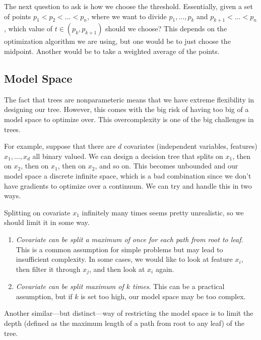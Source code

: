   The next question to ask is how we choose the threshold. Essentially, given a set of points $p_1 < p_2 < \ldots < p_n$, where we want to divide $p_1, \ldots, p_k$ and $p_{k+1} < \ldots < p_n$, which value of $t \in (p_k, p_{k+1})$ should we choose? This depends on the optimization algorithm we are using, but one would be to just choose the midpoint. Another would be to take a weighted average of the points. 

\subsection{Model Space} 

  The fact that trees are nonparameteric means that we have extreme flexibility in designing our tree. However, this comes with the big risk of having too big of a model space to optimize over. This overcomplexity is one of the big challenges in trees. 

  For example, suppose that there are $d$ covariates (independent variables, features) $x_1, \ldots, x_d$ all binary valued. We can design a decision tree that splits on $x_1$, then on $x_2$, then on $x_1$, then on $x_2$, and so on. This becomes unbounded and our model space a discrete infinite space, which is a bad combination since we don't have gradients to optimize over a continuum. We can try and handle this in two ways. 

  \begin{example}
    Splitting on covariate $x_1$ infinitely many times seems pretty unrealistic, so we should limit it in some way. 
    \begin{enumerate}
      \item \textit{Covariate can be split a maximum of once for each path from root to leaf}. This is a common assumption for simple problems but may lead to insufficient complexity. In some cases, we would like to look at feature $x_i$, then filter it through $x_j$, and then look at $x_i$ again.
      \item \textit{Covariate can be split maximum of $k$ times}. This can be a practical assumption, but if $k$ is set too high, our model space may be too complex. 
    \end{enumerate}
  \end{example}

  \begin{example}
    Another similar---but distinct---way of restricting the model space is to limit the depth (defined as the maximum length of a path from root to any leaf) of the tree. 
  \end{example} 
  
